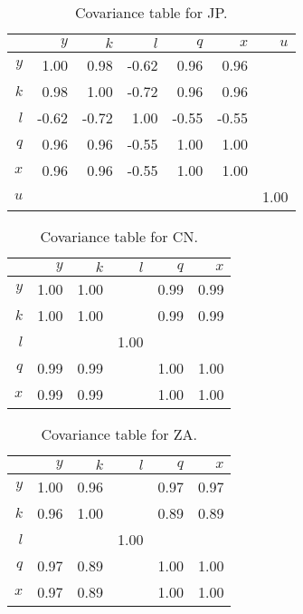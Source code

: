 \documentclass[preprint,authoryear,12pt]{elsarticle}\usepackage{graphicx, color}
\begin{document}
\begin{table}[H]
\begin{center}
\caption{Covariance table for JP.}
\label{tab:Covariance_JP}
{\tiny
\begin{tabular}{rrrrrrr}
  \hline
 & $y$ & $k$ & $l$ & $q$ & $x$ & $u$ \\ 
  \hline
$y$ & 1.00 & 0.98 & -0.62 & 0.96 & 0.96 &  \\ 
  $k$ & 0.98 & 1.00 & -0.72 & 0.96 & 0.96 &  \\ 
  $l$ & -0.62 & -0.72 & 1.00 & -0.55 & -0.55 &  \\ 
  $q$ & 0.96 & 0.96 & -0.55 & 1.00 & 1.00 &  \\ 
  $x$ & 0.96 & 0.96 & -0.55 & 1.00 & 1.00 &  \\ 
  $u$ &  &  &  &  &  & 1.00 \\ 
   \hline
\end{tabular}
}
\end{center}
\end{table}
\begin{table}[H]
\begin{center}
\caption{Covariance table for CN.}
\label{tab:Covariance_CN}
{\tiny
\begin{tabular}{rrrrrr}
  \hline
 & $y$ & $k$ & $l$ & $q$ & $x$ \\ 
  \hline
$y$ & 1.00 & 1.00 &  & 0.99 & 0.99 \\ 
  $k$ & 1.00 & 1.00 &  & 0.99 & 0.99 \\ 
  $l$ &  &  & 1.00 &  &  \\ 
  $q$ & 0.99 & 0.99 &  & 1.00 & 1.00 \\ 
  $x$ & 0.99 & 0.99 &  & 1.00 & 1.00 \\ 
   \hline
\end{tabular}
}
\end{center}
\end{table}
\begin{table}[H]
\begin{center}
\caption{Covariance table for ZA.}
\label{tab:Covariance_ZA}
{\tiny
\begin{tabular}{rrrrrr}
  \hline
 & $y$ & $k$ & $l$ & $q$ & $x$ \\ 
  \hline
$y$ & 1.00 & 0.96 &  & 0.97 & 0.97 \\ 
  $k$ & 0.96 & 1.00 &  & 0.89 & 0.89 \\ 
  $l$ &  &  & 1.00 &  &  \\ 
  $q$ & 0.97 & 0.89 &  & 1.00 & 1.00 \\ 
  $x$ & 0.97 & 0.89 &  & 1.00 & 1.00 \\ 
   \hline
\end{tabular}
}
\end{center}
\end{table}
\end{document}
